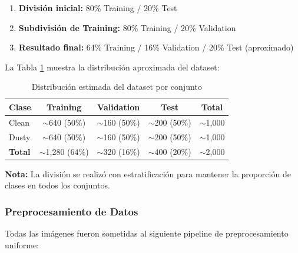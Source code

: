 \documentclass[11pt, a4paper]{article}
\begin{document}
\begin{enumerate}
    \item \textbf{División inicial:} 80\% Training / 20\% Test
    \item \textbf{Subdivisión de Training:} 80\% Training / 20\% Validation
    \item \textbf{Resultado final:} 64\% Training / 16\% Validation / 20\% Test (aproximado)
\end{enumerate}

La Tabla \ref{tab:dataset_dist} muestra la distribución aproximada del dataset:

\begin{table}[H]
\centering
\caption{Distribución estimada del dataset por conjunto}
\label{tab:dataset_dist}
\begin{tabular}{@{}lcccc@{}}
\toprule
\textbf{Clase} & \textbf{Training} & \textbf{Validation} & \textbf{Test} & \textbf{Total} \\
\midrule
Clean          & $\sim$640 (50\%)  & $\sim$160 (50\%)    & $\sim$200 (50\%) & $\sim$1,000 \\
Dusty          & $\sim$640 (50\%)  & $\sim$160 (50\%)    & $\sim$200 (50\%) & $\sim$1,000 \\
\midrule
\textbf{Total} & $\sim$1,280 (64\%) & $\sim$320 (16\%)    & $\sim$400 (20\%) & $\sim$2,000 \\
\bottomrule
\end{tabular}
\end{table}

\textbf{Nota:} La división se realizó con estratificación para mantener la proporción de clases en todos los conjuntos.

\subsubsection{Preprocesamiento de Datos}

Todas las imágenes fueron sometidas al siguiente pipeline de preprocesamiento uniforme:
\end{document}
